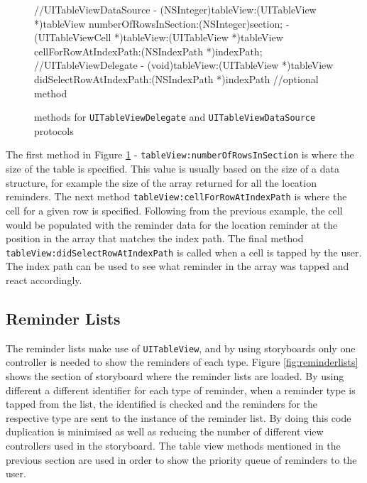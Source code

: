 \documentclass[12pt]{report}
\begin{document}
\begin{figure}[H]
\begin{objccode}
//UITableViewDataSource
- (NSInteger)tableView:(UITableView *)tableView 
 numberOfRowsInSection:(NSInteger)section;
- (UITableViewCell *)tableView:(UITableView *)tableView 
         cellForRowAtIndexPath:(NSIndexPath *)indexPath;
//UITableViewDelegate
- (void)tableView:(UITableView *)tableView 
didSelectRowAtIndexPath:(NSIndexPath *)indexPath //optional method
\end{objccode}
\caption{methods for \texttt{UITableViewDelegate} and \texttt{UITableViewDataSource} protocols}
\label{fig:tableview}
\end{figure}

The first method in Figure \ref{fig:tableview} - \texttt{tableView:numberOfRowsInSection} is where the size of the table is specified. This value is usually based on the size of a data structure, for example the size of the array returned for all the location reminders. The next method \texttt{tableView:cellForRowAtIndexPath} is where the cell for a given row is specified. Following from the previous example, the cell would be populated with the reminder data for the location reminder at the position in the array that matches the index path. The final method \texttt{tableView:didSelectRowAtIndexPath} is called when a cell is tapped by the user. The index path can be used to see what reminder in the array was tapped and react accordingly.

\subsection{Reminder Lists}

The reminder lists make use of \texttt{UITableView}, and by using storyboards only one controller is needed to show the reminders of each type. Figure \ref{fig:reminderlists} shows the section of storyboard where the reminder lists are loaded. By using different a different identifier for each type of reminder, when a reminder type is tapped from the list, the identified is checked and the reminders for the respective type are sent to the instance of the reminder list. By doing this code duplication is minimised as well as reducing the number of different view controllers used in the storyboard. The table view methods mentioned in the previous section are used in order to show the priority queue of reminders to the user.
\end{document}
